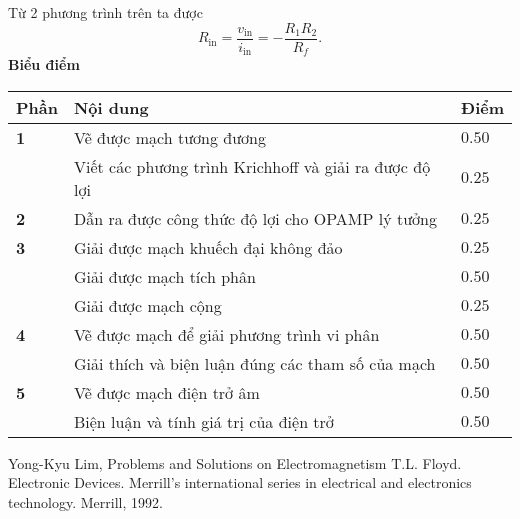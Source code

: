 Từ 2 phương trình trên ta được
\begin{equation}
    R_\text{in}=\dfrac{v_\text{in}}{i_\text{in}}=-\dfrac{R_1R_2}{R_f} .
\end{equation}
\textbf{Biểu điểm}
\begin{center}
\begin{tabular}{|>{\centering\arraybackslash}m{1cm}|>{\raggedright\arraybackslash}m{14cm}| >{\centering\arraybackslash}m{1cm}|}
    \hline
    \textbf{Phần} & \textbf{Nội dung} & \textbf{Điểm} \\
    \hline
    \textbf{1} & Vẽ được mạch tương đương & $0.50$ \\
    \cline{2-3}
    & Viết các phương trình Krichhoff và giải ra được độ lợi & $0.25$ \\
    \hline
    \textbf{2} & Dẫn ra được công thức độ lợi cho OPAMP lý tưởng & $0.25$ \\
    \hline
    \textbf{3} & Giải được mạch khuếch đại không đảo & $0.25$ \\
    \cline{2-3}
    & Giải được mạch tích phân & $0.50$ \\
    \cline{2-3}
    & Giải được mạch cộng & $0.25$ \\
    \hline
    \textbf{4} & Vẽ được mạch để giải phương trình vi phân & $0.50$ \\
    \cline{2-3}
    & Giải thích và biện luận đúng các tham số của mạch  & $0.50$ \\
    \hline
    \textbf{5}
    & Vẽ được mạch điện trở âm  & $0.50$ \\
    \cline{2-3}
    & Biện luận và tính giá trị của điện trở & $0.50$ \\ 
    
    \hline
\end{tabular}
\end{center}

\begin{thebibliography}{}
 Yong-Kyu Lim, Problems and Solutions on Electromagnetism 
 T.L. Floyd. Electronic Devices. Merrill’s international series in electrical and electronics technology.
Merrill, 1992.
\end{thebibliography}